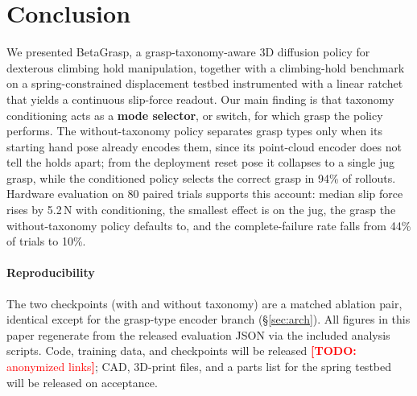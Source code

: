 \documentclass[letterpaper, 10pt, journal, twoside]{IEEEtran}
\newcommand{\todo}[1]{\textcolor{red}{\textbf{[TODO:} #1\textbf{]}}}
\begin{document}
\section{Conclusion}
We presented BetaGrasp, a grasp-taxonomy-aware 3D diffusion policy for dexterous
climbing hold manipulation, together with a climbing-hold benchmark on a
spring-constrained displacement testbed instrumented with a linear ratchet that
yields a continuous slip-force readout. Our main finding is that taxonomy conditioning
acts as a \textbf{mode selector}, or switch, for which grasp the policy performs. The without-taxonomy policy separates grasp types only when its
starting hand pose already encodes them, since its point-cloud encoder does not tell
the holds apart; from the deployment reset pose it collapses to
a single jug grasp, while the conditioned policy selects the correct grasp in 94\% of
rollouts. Hardware evaluation on 80 paired trials supports this
account: median slip force rises by 5.2\,N with conditioning, the smallest effect is
on the jug, the grasp the without-taxonomy policy defaults to, and the complete-failure
rate falls from 44\% of trials to 10\%.

\paragraph*{Reproducibility}
The two checkpoints (with and without taxonomy) are a matched ablation pair, identical
except for the grasp-type encoder branch (\S\ref{sec:arch}). All figures in this paper
regenerate from the released evaluation JSON via the included analysis scripts. Code,
training data, and checkpoints will be released \todo{anonymized links}; CAD, 3D-print
files, and a parts list for the spring testbed will be released on acceptance.



\end{document}
